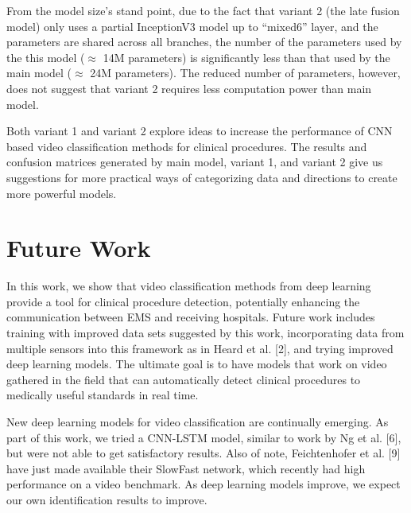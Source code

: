 \documentclass[letterpaper, 10 pt, conference]{ieeeconf}  %
\begin{document}
From the model size's stand point, due to the fact that variant 2 (the late fusion model) only uses a partial InceptionV3 model up to ``mixed6'' layer, and the parameters are shared across all branches, the number of the parameters used by the this model ($\approx$ 14M parameters) is significantly less than that used by the main model ($\approx$ 24M parameters). The reduced number of parameters, however, does not suggest that variant 2 requires less computation power than main model. 

Both variant 1 and variant 2 explore ideas to increase the performance of CNN based video classification methods for clinical procedures. The results and confusion matrices generated by main model, variant 1, and variant 2 give us suggestions for more practical ways of categorizing data and directions to create more powerful models. 

\section{Future Work}

In this work, we show that video classification methods from deep learning provide a tool for clinical procedure detection, potentially enhancing the communication between EMS and receiving hospitals. Future work includes training with improved data sets suggested by this work, incorporating data from multiple sensors into this framework as in Heard et al. [2], and trying improved deep learning models. The ultimate goal is to have models that work on video gathered in the field that can automatically detect clinical procedures to medically useful standards in real time.

New deep learning models for video classification are continually emerging. As part of this work, we tried a CNN-LSTM model, similar to work by Ng et al. [6], but were not able to get satisfactory results. Also of note, Feichtenhofer et al. [9] have just made available their SlowFast network, which recently had high performance on a video benchmark. As deep learning models improve, we expect our own identification results to improve.

\end{document}
